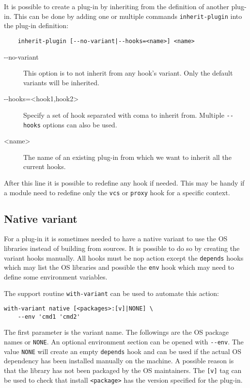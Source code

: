 \documentclass[a4paper,12pt,twoside]{article}
\newcommand{\code}[1]{\texttt{#1}}
\newcommand{\ddash}{-{}-}
\begin{document}
It is possible to create a plug-in by inheriting from the definition
of another plug-in. This can be done by adding one or multiple commands \code{inherit-plugin} into the plug-in definition:

\begin{lstlisting}
	inherit-plugin [--no-variant|--hooks=<name>] <name>
\end{lstlisting}

\begin{description}
	\item[\ddash{}no-variant] This option is to not inherit from any hook's variant. Only the default variants will be inherited.
	\item[\ddash{}hooks=<hook1,hook2>] Specify a set of hook separated with coma to inherit from. Multiple \code{\ddash{}hooks} options can also be used.
	\item[<name>] The name of an existing plug-in from which we want to inherit all the current hooks.
\end{description}

After this line it is possible to redefine any hook if needed. This may be handy if a module need to redefine only
the \code{vcs} or \code{proxy} hook for a specific context.

\subsection{Native variant}
\label{native variant}

For a plug-in it is sometimes needed to have a native variant to use the OS libraries instead of building from sources. It is possible to do so by creating the variant hooks manually. All hooks must be nop action except the \code{depends} hooks which may list the OS libraries and possible the \code{env} hook which may need to define some environment variables.

The support routine \code{with-variant} can be used to automate this action:

\begin{lstlisting}
with-variant native [<packages>:[v]|NONE] \
	--env 'cmd1 'cmd2'
\end{lstlisting}

The first parameter is the variant name. The followings are the OS package names or \code{NONE}. An optional environment section can be opened with \code{\ddash{}env}. The value \code{NONE} will create an empty \code{depends} hook and can be used if the actual OS dependency has been installed manually on the machine. A possible reason is that the library has not been packaged by the OS maintainers. The \code{[v]} tag can be used to check that install \code{<package>} has the version specified for the plug-in.
\end{document}

